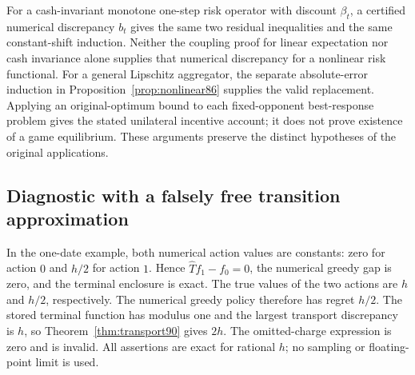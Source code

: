 For a cash-invariant monotone one-step risk operator with discount $\beta_t$, a certified numerical discrepancy $b_t$ gives the same two residual inequalities and the same constant-shift induction. Neither the coupling proof for linear expectation nor cash invariance alone supplies that numerical discrepancy for a nonlinear risk functional. For a general Lipschitz aggregator, the separate absolute-error induction in Proposition~\ref{prop:nonlinear86} supplies the valid replacement. Applying an original-optimum bound to each fixed-opponent best-response problem gives the stated unilateral incentive account; it does not prove existence of a game equilibrium. These arguments preserve the distinct hypotheses of the original applications.

\subsection{Diagnostic with a falsely free transition approximation}
In the one-date example, both numerical action values are constants: zero for action $0$ and $h/2$ for action $1$. Hence $\widehat T f_1-f_0=0$, the numerical greedy gap is zero, and the terminal enclosure is exact. The true values of the two actions are $h$ and $h/2$, respectively. The numerical greedy policy therefore has regret $h/2$. The stored terminal function has modulus one and the largest transport discrepancy is $h$, so Theorem~\ref{thm:transport90} gives $2h$. The omitted-charge expression is zero and is invalid. All assertions are exact for rational $h$; no sampling or floating-point limit is used.
